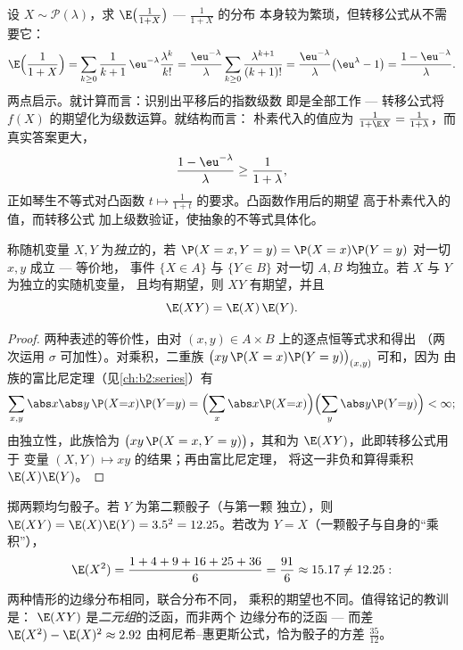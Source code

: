 \begin{example}[转移公式的应用]\label{ex:b2:randomvar:transferex}
设 $X \sim \mathcal P(\lambda)$，求
$\E\bigl(\frac1{1+X}\bigr)$ --- $\frac1{1+X}$ 的分布
本身较为繁琐，但转移公式从不需要它：
\[
\E\Bigl(\frac1{1+X}\Bigr)
= \sum_{k\geq0}\frac{1}{k+1}\,\eu^{-\lambda}
\frac{\lambda^k}{k!}
= \frac{\eu^{-\lambda}}{\lambda}\sum_{k\geq0}
\frac{\lambda^{k+1}}{(k+1)!}
= \frac{\eu^{-\lambda}}{\lambda}\bigl(\eu^\lambda - 1\bigr)
= \frac{1 - \eu^{-\lambda}}{\lambda} .
\]
两点启示。就计算而言：识别出平移后的指数级数
即是全部工作 --- 转移公式将
$f(X)$ 的期望化为级数运算。就结构而言：
朴素代入的值应为 $\frac1{1 + \E X} =
\frac1{1 + \lambda}$，而真实答案更大，
\[
\frac{1 - \eu^{-\lambda}}{\lambda} \geq
\frac{1}{1 + \lambda},
\]
正如琴生不等式对凸函数 $t
\mapsto \frac1{1+t}$ 的要求。凸函数作用后的期望
高于朴素代入的值，而转移公式
加上级数验证，使抽象的不等式具体化。
\end{example}

\begin{theorem}[独立性与乘积]\label{thm:b2:randomvar:product}
称随机变量 $X, Y$ 为\emph{独立}的，若 $\P(X = x, Y =
y) = \P(X = x)\P(Y = y)$ 对一切 $x, y$ 成立 --- 等价地，
事件 $\{X \in A\}$ 与 $\{Y \in B\}$ 对一切 $A,
B$ 均独立。若 $X$ 与 $Y$ 为独立的实随机变量，
且均有期望，则 $XY$ 有期望，并且
\[
\E(XY) = \E(X)\,\E(Y) .
\]
\end{theorem}

\begin{proof}
两种表述的等价性，由对
$(x, y) \in A \times B$ 上的逐点恒等式求和得出
（两次运用 $\sigma$ 可加性）。对乘积，二重族
$\bigl(xy\,\P(X = x)\P(Y = y)\bigr)_{(x,y)}$ 可和，因为
由族的富比尼定理（见\cref{ch:b2:series}）有
\[
\sum_{x, y}\abs x \abs y\,\P(X{=}x)\P(Y{=}y)
= \Bigl(\sum_x \abs x \P(X{=}x)\Bigr)
\Bigl(\sum_y \abs y \P(Y{=}y)\Bigr) < \infty ;
\]
由独立性，此族恰为 $\bigl(xy\,\P(X = x, Y =
y)\bigr)$，其和为 $\E(XY)$，此即转移公式用于
变量 $(X, Y) \mapsto xy$ 的结果；再由富比尼定理，
将这一非负和算得乘积 $\E(X)\E(Y)$。
\end{proof}

\begin{example}\label{ex:b2:randomvar:productcontrast}
掷两颗均匀骰子。若 $Y$ 为第二颗骰子（与第一颗
独立），则 $\E(XY) = \E(X)\E(Y) = 3.5^2 = 12.25$。若改为
$Y = X$（一颗骰子与自身的“乘积”），
\[
\E(X^2) = \frac{1 + 4 + 9 + 16 + 25 + 36}{6} = \frac{91}{6}
\approx 15.17 \neq 12.25 :
\]
两种情形的边缘分布相同，联合分布不同，
乘积的期望也不同。值得铭记的教训是：
$\E(XY)$ 是\emph{二元组}的泛函，而非两个
边缘分布的泛函 --- 而差 $\E(X^2) - \E(X)^2 \approx 2.92$
由柯尼希--惠更斯公式，恰为骰子的方差
$\frac{35}{12}$。
\end{example}


